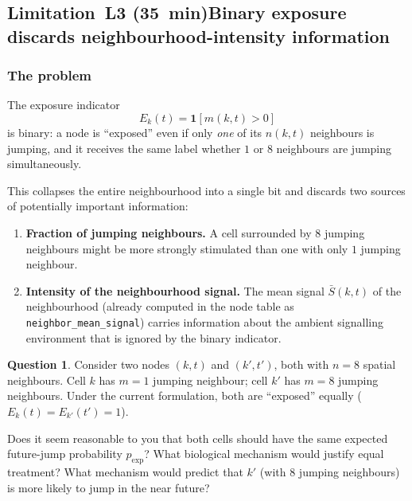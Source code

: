 \documentclass[11pt,a4paper]{article}
\theoremstyle{definition}
\newtheorem{question}{Question}
\newcommand{\expo}[2]{E_{#1}(#2)}
\newcommand{\pE}{p_{\mathrm{exp}}}
\newcommand{\1}[1]{\mathbf{1}\!\left[#1\right]}
\newcommand{\param}[1]{\texttt{#1}}
\begin{document}
\subsection*{Limitation~L3 (35~min)\quad Binary exposure discards
  neighbourhood-intensity information}

\subsubsection*{The problem}

The exposure indicator
\[
  \expo{k}{t} = \1{m(k,t) > 0}
\]
is binary: a node is ``exposed'' even if only \emph{one} of its $n(k,t)$
neighbours is jumping, and it receives the same label whether $1$ or $8$
neighbours are jumping simultaneously.

This collapses the entire neighbourhood into a single bit and discards two
sources of potentially important information:
\begin{enumerate}
  \item \textbf{Fraction of jumping neighbours.}
        A cell surrounded by $8$ jumping neighbours might be more strongly
        stimulated than one with only $1$ jumping neighbour.
  \item \textbf{Intensity of the neighbourhood signal.}
        The mean signal $\bar{S}(k,t)$ of the neighbourhood (already computed
        in the node table as \param{neighbor\_mean\_signal}) carries information
        about the ambient signalling environment that is ignored by the binary
        indicator.
\end{enumerate}

\begin{question}
Consider two nodes $(k,t)$ and $(k',t')$, both with
$n = 8$ spatial neighbours.
Cell $k$ has $m=1$ jumping neighbour; cell $k'$ has $m=8$ jumping neighbours.
Under the current formulation, both are ``exposed'' equally
($\expo{k}{t} = \expo{k'}{t'} = 1$).

Does it seem reasonable to you that both cells should have the
same expected future-jump probability $\pE$?
What biological mechanism would justify equal treatment?
What mechanism would predict that $k'$ (with 8 jumping neighbours) is more
likely to jump in the near future?


\end{question}
\end{document}
